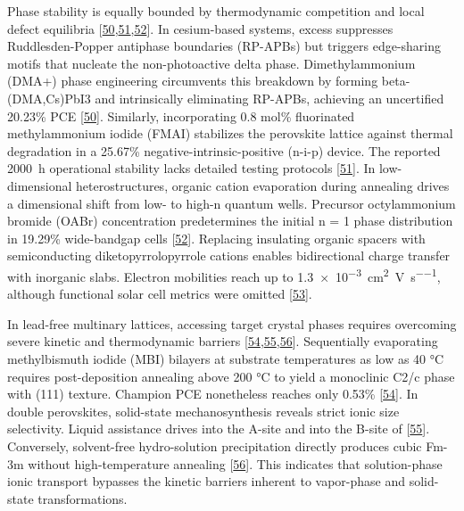 \documentclass[
  11pt,
]{article}
\begin{document}
Phase stability is equally bounded by thermodynamic competition and
local defect equilibria
{[}\href{https://doi.org/10.1002/adma.74538}{50},\href{https://doi.org/10.1002/aenm.71396}{51},\href{https://doi.org/10.1002/advs.76791}{52}{]}.
In cesium-based systems, excess  suppresses Ruddlesden-Popper
antiphase boundaries (RP-APBs) but triggers edge-sharing 
motifs that nucleate the non-photoactive delta phase. Dimethylammonium
(DMA+) phase engineering circumvents this breakdown by forming
beta-(DMA,Cs)PbI3 and intrinsically eliminating RP-APBs, achieving an
uncertified 20.23\% PCE
{[}\href{https://doi.org/10.1002/adma.74538}{50}{]}. Similarly,
incorporating 0.8 mol\% fluorinated methylammonium iodide (FMAI)
stabilizes the perovskite lattice against thermal degradation in a
25.67\% negative-intrinsic-positive (n-i-p) device. The reported
\qty{2000}{\hour} operational stability lacks detailed testing protocols
{[}\href{https://doi.org/10.1002/aenm.71396}{51}{]}. In low-dimensional
heterostructures, organic cation evaporation during annealing drives a
dimensional shift from low- to high-n quantum wells. Precursor
octylammonium bromide (OABr) concentration predetermines the initial n =
1 phase distribution in 19.29\% wide-bandgap cells
{[}\href{https://doi.org/10.1002/advs.76791}{52}{]}. Replacing
insulating organic spacers with semiconducting diketopyrrolopyrrole
cations enables bidirectional charge transfer with inorganic
 slabs. Electron mobilities reach up to
\qty{1.3e-3}{\centi\meter\squared\per\volt\per\second}, although
functional solar cell metrics were omitted
{[}\href{https://doi.org/10.1002/adma.74681}{53}{]}.

In lead-free multinary lattices, accessing target crystal phases
requires overcoming severe kinetic and thermodynamic barriers
{[}\href{https://doi.org/10.1016/j.solener.2026.114961}{54},\href{https://doi.org/10.26434/chemrxiv.15008057/v1}{55},\href{https://doi.org/10.1038/s43246-026-01261-3}{56}{]}.
Sequentially evaporating methylbismuth iodide (MBI) bilayers at
substrate temperatures as low as 40 °C requires post-deposition
annealing above 200 °C to yield a monoclinic C2/c phase with (111)
texture. Champion PCE nonetheless reaches only 0.53\%
{[}\href{https://doi.org/10.1016/j.solener.2026.114961}{54}{]}. In
double perovskites, solid-state mechanosynthesis reveals strict ionic
size selectivity. Liquid assistance drives  into the A-site and
 into the B-site of 
{[}\href{https://doi.org/10.26434/chemrxiv.15008057/v1}{55}{]}.
Conversely, solvent-free hydro-solution precipitation directly produces
cubic Fm-3m  without high-temperature annealing
{[}\href{https://doi.org/10.1038/s43246-026-01261-3}{56}{]}. This
indicates that solution-phase ionic transport bypasses the kinetic
barriers inherent to vapor-phase and solid-state transformations.
\end{document}
